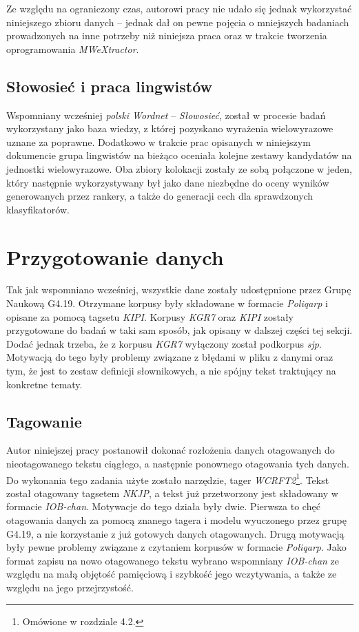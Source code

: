 Ze względu na ograniczony czas, autorowi pracy nie udało się jednak wykorzystać niniejszego zbioru danych -- jednak dał on pewne pojęcia o mniejszych badaniach prowadzonych na inne potrzeby niż niniejsza praca oraz w trakcie tworzenia oprogramowania \emph{MWeXtractor}.

\subsection{Słowosieć i praca lingwistów}
Wspomniany wcześniej \emph{polski Wordnet} -- \emph{Słowosieć}, został w procesie badań wykorzystany jako baza wiedzy, z której pozyskano wyrażenia wielowyrazowe uznane za poprawne.
Dodatkowo w trakcie prac opisanych w niniejszym dokumencie grupa lingwistów na bieżąco oceniała kolejne zestawy kandydatów na jednostki wielowyrazowe.
Oba zbiory kolokacji zostały ze sobą połączone w jeden, który następnie wykorzystywany był jako dane niezbędne do oceny wyników generowanych przez rankery, a także do generacji cech dla sprawdzonych klasyfikatorów.

\section{Przygotowanie danych}
Tak jak wspomniano wcześniej, wszystkie dane zostały udostępnione przez Grupę Naukową G4.19.
Otrzymane korpusy były składowane w formacie \emph{Poliqarp} i opisane za pomocą tagsetu \emph{KIPI}.
Korpusy \emph{KGR7} oraz \emph{KIPI} zostały przygotowane do badań w taki sam sposób, jak opisany w dalszej części tej sekcji.
Dodać jednak trzeba, że z korpusu \emph{KGR7} wyłączony został podkorpus \emph{sjp}.
Motywacją do tego były problemy związane z błędami w pliku z danymi oraz tym, że jest to zestaw definicji słownikowych, a nie spójny tekst traktujący na konkretne tematy.

\subsection{Tagowanie}
Autor niniejszej pracy postanowił dokonać rozłożenia danych otagowanych do nieotagowanego tekstu ciągłego, a następnie ponownego otagowania tych danych.
Do wykonania tego zadania użyte zostało narzędzie, tager \emph{WCRFT2}\footnote{Omówione w rozdziale 4.2.}.
Tekst został otagowany tagsetem \emph{NKJP}, a tekst już przetworzony jest składowany w formacie \emph{IOB-chan}.
Motywacje do tego działa były dwie.
Pierwsza to chęć otagowania danych za pomocą znanego tagera i modelu wyuczonego przez grupę G4.19, a nie korzystanie z już gotowych danych otagowanych. 
Drugą motywacją były pewne problemy związane z czytaniem korpusów w formacie \emph{Poliqarp}.
Jako format zapisu na nowo otagowanego tekstu wybrano wspomniany \emph{IOB-chan} ze względu na małą objętość pamięciową i szybkość jego wczytywania, a także ze względu na jego przejrzystość.

